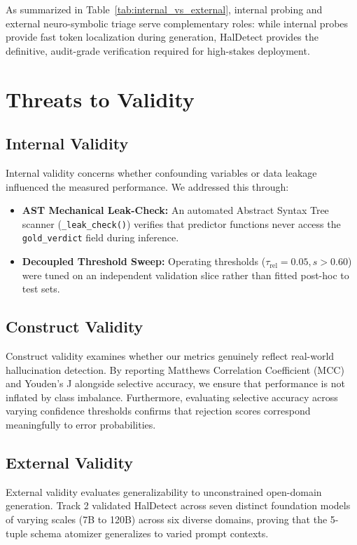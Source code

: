 As summarized in Table~\ref{tab:internal_vs_external}, internal probing and external neuro-symbolic triage serve complementary roles: while internal probes provide fast token localization during generation, HalDetect provides the definitive, audit-grade verification required for high-stakes deployment.

\section{Threats to Validity}
\label{sec:threats_to_validity}

\subsection{Internal Validity}
Internal validity concerns whether confounding variables or data leakage influenced the measured performance. We addressed this through:
\begin{itemize}
    \item \textbf{AST Mechanical Leak-Check:} An automated Abstract Syntax Tree scanner (\texttt{\_leak\_check()}) verifies that predictor functions never access the \texttt{gold\_verdict} field during inference.
    \item \textbf{Decoupled Threshold Sweep:} Operating thresholds ($\tau_{\text{rel}} = 0.05, s > 0.60$) were tuned on an independent validation slice rather than fitted post-hoc to test sets.
\end{itemize}

\subsection{Construct Validity}
Construct validity examines whether our metrics genuinely reflect real-world hallucination detection. By reporting Matthews Correlation Coefficient (MCC) and Youden's J alongside selective accuracy, we ensure that performance is not inflated by class imbalance. Furthermore, evaluating selective accuracy across varying confidence thresholds confirms that rejection scores correspond meaningfully to error probabilities.

\subsection{External Validity}
External validity evaluates generalizability to unconstrained open-domain generation. Track 2 validated HalDetect across seven distinct foundation models of varying scales (7B to 120B) across six diverse domains, proving that the 5-tuple schema atomizer generalizes to varied prompt contexts.

